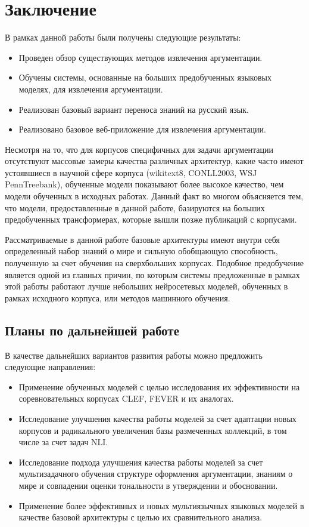 \section{Заключение}
В рамках данной работы были получены следующие результаты:
\begin{itemize}
    \item Проведен обзор существующих методов извлечения аргументации.
    \item Обучены системы, основанные на больших предобученных языковых моделях, для извлечения аргументации.
    \item Реализован базовый вариант переноса знаний на русский язык.
    \item Реализовано базовое веб-приложение для извлечения аргументации.
\end{itemize}

Несмотря на то, что для корпусов специфичных для задачи аргументации отсутствуют массовые замеры качества различных архитектур, какие часто имеют устоявшиеся в научной сфере корпуса (wikitext8, CONLL2003, WSJ PennTreebank), обученные модели показывают более высокое качество, чем модели обученных в исходных работах. Данный факт во многом объясняется тем, что модели, предоставленные в данной работе, базируются на больших предобученных трансформерах, которые вышли позже публикаций с корпусами. 

Рассматриваемые в данной работе базовые архитектуры имеют внутри себя определенный набор знаний о мире и сильную обобщающую способность, полученную за счет обучения на сверхбольших корпусах. Подобное предобучение является одной из главных причин, по которым системы предложенные в рамках этой работы работают лучше небольших нейросетевых моделей, обученных в рамках исходного корпуса, или методов машинного обучения.


\subsection{Планы по дальнейшей работе}
В качестве дальнейших вариантов развития работы можно предложить следующие направления:
\begin{itemize}
    \item Применение обученных моделей с целью исследования их эффективности на соревновательных корпусах CLEF, FEVER и их аналогах.
    \item Исследование улучшения качества работы моделей за счет адаптации новых корпусов и радикального увеличения базы размеченных коллекций, в том числе за счет задач NLI.
    \item Исследование подхода улучшения качества работы моделей за счет мультизадачного обучения структуре оформления аргументации, знаниям о мире и совпадении оценки тональности в утверждении и обосновании.
    \item Применение более эффективных и новых мультиязычных языковых моделей в качестве базовой архитектуры с целью их сравнительного анализа.
\end{itemize}
